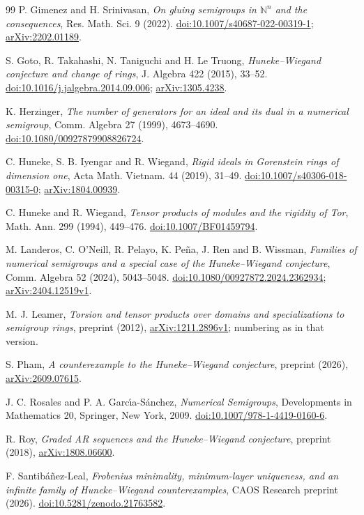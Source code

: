 \documentclass[11pt]{article}
\theoremstyle{definition}
\theoremstyle{remark}
\newcommand{\N}{\mathbb{N}}
\begin{document}
{\begin{thebibliography}{99}
P. Gimenez and H. Srinivasan,
\emph{On gluing semigroups in $\N^n$ and the consequences},
Res. Math. Sci. 9 (2022).
\href{https://doi.org/10.1007/s40687-022-00319-1}{doi:10.1007/s40687-022-00319-1};
\href{https://arxiv.org/abs/2202.01189}{arXiv:2202.01189}.

S. Goto, R. Takahashi, N. Taniguchi and H. Le Truong,
\emph{Huneke--Wiegand conjecture and change of rings},
J. Algebra 422 (2015), 33--52.
\href{https://doi.org/10.1016/j.jalgebra.2014.09.006}{doi:10.1016/j.jalgebra.2014.09.006};
\href{https://arxiv.org/abs/1305.4238}{arXiv:1305.4238}.

K. Herzinger,
\emph{The number of generators for an ideal and its dual in a numerical semigroup},
Comm. Algebra 27 (1999), 4673--4690.
\href{https://doi.org/10.1080/00927879908826724}{doi:10.1080/00927879908826724}.

C. Huneke, S. B. Iyengar and R. Wiegand,
\emph{Rigid ideals in Gorenstein rings of dimension one},
Acta Math. Vietnam. 44 (2019), 31--49.
\href{https://doi.org/10.1007/s40306-018-00315-0}{doi:10.1007/s40306-018-00315-0};
\href{https://arxiv.org/abs/1804.00939}{arXiv:1804.00939}.

C. Huneke and R. Wiegand,
\emph{Tensor products of modules and the rigidity of Tor},
Math. Ann. 299 (1994), 449--476.
\href{https://doi.org/10.1007/BF01459794}{doi:10.1007/BF01459794}.

M. Landeros, C. O'Neill, R. Pelayo, K. Pe\~na, J. Ren and B. Wissman,
\emph{Families of numerical semigroups and a special case of the Huneke--Wiegand conjecture},
Comm. Algebra 52 (2024), 5043--5048.
\href{https://doi.org/10.1080/00927872.2024.2362934}{doi:10.1080/00927872.2024.2362934};
\href{https://arxiv.org/abs/2404.12519}{arXiv:2404.12519v1}.

M. J. Leamer,
\emph{Torsion and tensor products over domains and specializations to semigroup rings},
preprint (2012), \href{https://arxiv.org/abs/1211.2896}{arXiv:1211.2896v1}; numbering as in that version.

S. Pham,
\emph{A counterexample to the Huneke--Wiegand conjecture},
preprint (2026), \href{https://arxiv.org/abs/2609.07615}{arXiv:2609.07615}.

J. C. Rosales and P. A. Garc\'{\i}a-S\'anchez,
\emph{Numerical Semigroups}, Developments in Mathematics 20, Springer, New York, 2009.
\href{https://doi.org/10.1007/978-1-4419-0160-6}{doi:10.1007/978-1-4419-0160-6}.

R. Roy,
\emph{Graded AR sequences and the Huneke--Wiegand conjecture},
preprint (2018), \href{https://arxiv.org/abs/1808.06600}{arXiv:1808.06600}.

F. Santib\'a\~nez-Leal,
\emph{Frobenius minimality, minimum-layer uniqueness, and an infinite family of
Huneke--Wiegand counterexamples}, CAOS Research preprint (2026).
\href{https://doi.org/10.5281/zenodo.21763582}{doi:10.5281/zenodo.21763582}.

\end{thebibliography}
}
\end{document}
